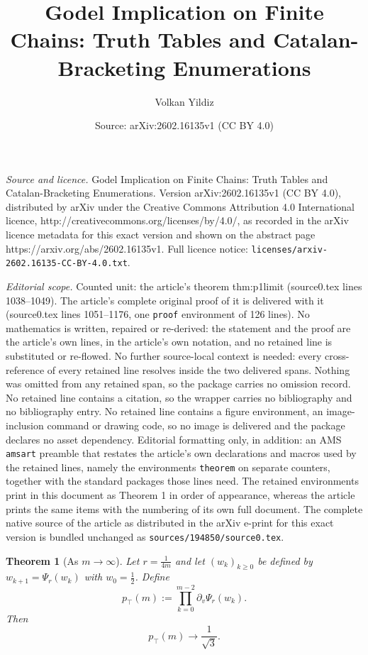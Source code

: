 \documentclass[10pt,a4paper]{amsart}
\title{Godel Implication on Finite Chains: Truth Tables and Catalan-Bracketing Enumerations}
\author{Volkan Yildiz}
\date{Source: arXiv:2602.16135v1 (CC BY 4.0)}
\newtheorem{theorem}{Theorem}
\newcommand{\ptop}{p_{\top}}
\begin{document}
\maketitle

\noindent\emph{Source and licence.} Godel Implication on Finite Chains: Truth Tables and Catalan-Bracketing Enumerations. Version arXiv:2602.16135v1 (CC BY 4.0), distributed by arXiv under the Creative Commons Attribution 4.0 International licence, http://creativecommons.org/licenses/by/4.0/, as recorded in the arXiv licence metadata for this exact version and shown on the abstract page https://arxiv.org/abs/2602.16135v1. Full licence notice: \texttt{licenses/arxiv-2602.16135-CC-BY-4.0.txt}.\par\smallskip

\noindent\textit{Editorial scope.} Counted unit: the article's theorem thm:p1limit (source0.tex lines 1038--1049). The article's complete original proof of it is delivered with it (source0.tex lines 1051--1176, one \texttt{proof} environment of 126 lines). No mathematics is written, repaired or re-derived: the statement and the proof are the article's own lines, in the article's own notation, and no retained line is substituted or re-flowed.  No further source-local context is needed: every cross-reference of every retained line resolves inside the two delivered spans.  Nothing was omitted from any retained span, so the package carries no omission record.  No retained line contains a citation, so the wrapper carries no bibliography and no bibliography entry.  No retained line contains a figure environment, an image-inclusion command or drawing code, so no image is delivered and the package declares no asset dependency.  Editorial formatting only, in addition: an AMS \texttt{amsart} preamble that restates the article's own declarations and macros used by the retained lines, namely the environments \texttt{theorem} on separate counters, together with the standard packages those lines need.  The retained environments print in this document as Theorem 1 in order of appearance, whereas the article prints the same items with the numbering of its own full document.  The complete native source of the article as distributed in the arXiv e-print for this exact version is bundled unchanged as \texttt{sources/194850/source0.tex}.
\begin{theorem}[As $m\to\infty$]
\label{thm:p1limit}
Let \(r=\frac1{4m}\) and let \((w_k)_{k\ge0}\) be defined by \(w_{k+1}=\Psi_r(w_k)\) with
\(w_0=\frac12\). Define
\[
\ptop(m):=\prod_{k=0}^{m-2}\partial_v\Psi_r(w_k).
\]
Then
\[
\boxed{\;\;\ptop(m)\longrightarrow \frac{1}{\sqrt{3}}.\;\;}
\]
\end{theorem}
\end{document}
